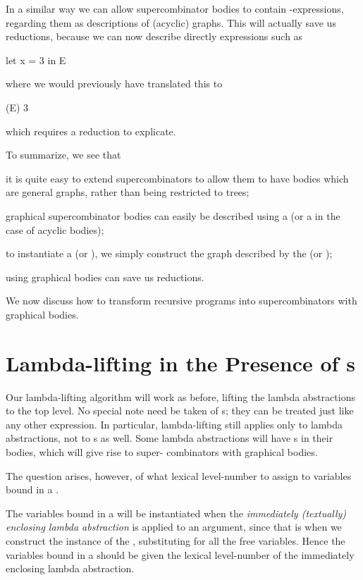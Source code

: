 In a similar way we can allow supercombinator bodies to contain -expressions, regarding them as descriptions of (acyclic) graphs. This will
actually save us reductions, because we can now describe directly expressions
such as
\begin{mlcoded}
    let x = 3 in E
\end{mlcoded}
where we would previously have translated this to
\begin{letalign}
    (E) 3
\end{letalign}
which requires a reduction to explicate.

To summarize, we see that

\begin{numbered}
    \item it is quite easy to extend supercombinators to allow them to have bodies
    which are general graphs, rather than being restricted to trees;
    \item graphical supercombinator bodies can easily be described using a 
    (or a  in the case of acyclic bodies);
    \item to instantiate a  (or ), we simply construct the graph described by
    the  (or );
    \item using graphical bodies can save us reductions.
\end{numbered}
We now discuss how to transform recursive programs into supercombinators
with graphical bodies.

\section{Lambda-lifting in the Presence of s}

Our lambda-lifting algorithm will work as before, lifting the lambda
abstractions to the top level. No special note need be taken of s; they can
be treated just like any other expression. In particular, lambda-lifting still
applies only to lambda abstractions, not to s as well. Some lambda
abstractions will have s in their bodies, which will give rise to super-
combinators with graphical bodies.

The question arises, however, of what lexical level-number to assign to
variables bound in a .

The variables bound in a  will be instantiated when the \textit{immediately
    (textually) enclosing lambda abstraction} is applied to an argument, since that
is when we construct the instance of the , substituting for all the free
variables. Hence the variables bound in a  should be given the lexical
level-number of the immediately enclosing lambda abstraction.

